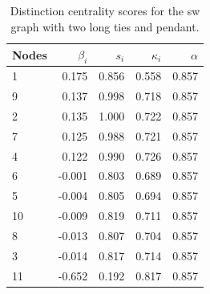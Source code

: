 \begin{table}
\centering
\caption{\label{tab:sw2p}Distinction centrality scores for the sw graph with two long ties and pendant.}
\centering
\begin{tabular}[t]{lrrrr}
\toprule
Nodes & $\beta_i$ & $s_i$ & $\kappa_i$ & $\alpha$\\
\midrule
1 & 0.175 & 0.856 & 0.558 & 0.857\\
9 & 0.137 & 0.998 & 0.718 & 0.857\\
2 & 0.135 & 1.000 & 0.722 & 0.857\\
7 & 0.125 & 0.988 & 0.721 & 0.857\\
4 & 0.122 & 0.990 & 0.726 & 0.857\\
6 & -0.001 & 0.803 & 0.689 & 0.857\\
5 & -0.004 & 0.805 & 0.694 & 0.857\\
10 & -0.009 & 0.819 & 0.711 & 0.857\\
8 & -0.013 & 0.807 & 0.704 & 0.857\\
3 & -0.014 & 0.817 & 0.714 & 0.857\\
11 & -0.652 & 0.192 & 0.817 & 0.857\\
\bottomrule
\end{tabular}
\end{table}
